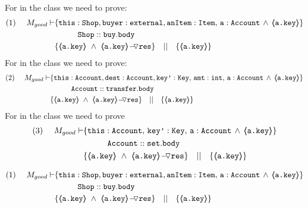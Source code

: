 \begin{proofO}
\noindent
For    in the  class we need to prove:
\small
\begin{align*}
\text{(1)}  \ \ \ \ M_{good} \vdash 
		&	\{  \prg{this}:\prg{Shop}, \prg{buyer} : \prg{external}, \prg{anItem} : \prg{Item},\, \prg{a}:\prg{Account}\,\wedge\, 
				{\inside{\prg{a.key}}} \} \\
		& \SPT \prg{Shop}::\prg{buy}.\prg{body}\ \\  
		& \{ {\inside{\prg{a.key}}}\ \wedge\ {\PushASLong {\prg{res}} {\inside{\prg{a.key}}}}  \} \ \ \  || \ \ \ 
		   \{ {\inside{\prg{a.key}}} \}
\end{align*}
\normalsize
For  in the  class we need to prove:
\small
\begin{align*}
\text{(2)}  \ \ \ \ M_{good} \vdash 
		&	\{  \prg{this}:\prg{Account}, \prg{dest} : \prg{Account}, 
			\prg{key'} : \prg{Key},\, \prg{amt}:\prg{int},\, \prg{a}:\prg{Account}\,
			\wedge\,{\inside{\prg{a.key}}} \} \\
		&\SPT \prg{Account}::\prg{transfer}.\prg{body}\ \\  
		& \{ {\inside{\prg{a.key}}}\ \wedge\ {\PushASLong {\prg{res}} {\inside{\prg{a.key}}}}  \} \ \ \  || \ \ \ 
		   \{ {\inside{\prg{a.key}}} \}
\end{align*}
\normalsize
For  in the  class we need to prove
\small
\begin{align*}
\text{(3)}  \ \ \ \ M_{good} \vdash 
		&	\{  \prg{this}:\prg{Account},\,
			\prg{key'} : \prg{Key},\, \prg{a}:\prg{Account}\,
			\wedge\,{\inside{\prg{a.key}}} \} \\
		& \SPT \prg{Account}::\prg{set}.\prg{body}\ \\  
		& \{ {\inside{\prg{a.key}}}\ \wedge\ {\PushASLong {\prg{res}} {\inside{\prg{a.key}}}}  \} \ \ \  || \ \ \ 
		   \{ {\inside{\prg{a.key}}} \}
\end{align*}
\normalsize


\end{proofO}

\begin{lemma}
\label{l:sub:one}
 
\begin{align*}
\text{(1)}  \ \ \ \ M_{good} \vdash 
		&	\{  \prg{this}:\prg{Shop}, \prg{buyer} : \prg{external}, \prg{anItem} : \prg{Item},\, \prg{a}:\prg{Account}\,\wedge\, 
				{\inside{\prg{a.key}}} \} \\
		& \SPT \prg{Shop}::\prg{buy}.\prg{body}\ \\  
		& \{ {\inside{\prg{a.key}}}\ \wedge\ {\PushASLong {\prg{res}} {\inside{\prg{a.key}}}}  \} \ \ \  || \ \ \ 
		   \{ {\inside{\prg{a.key}}} \}
\end{align*}
 
\end{lemma}

